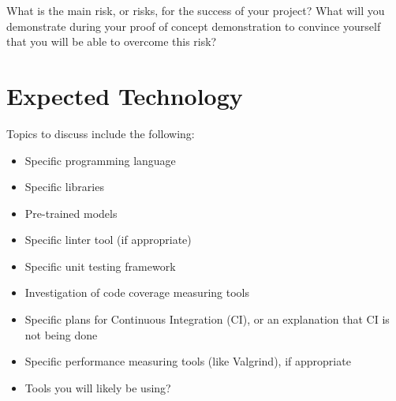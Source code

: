 \documentclass{article}
\begin{document}
What is the main risk, or risks, for the success of your project?  What will you
demonstrate during your proof of concept demonstration to convince yourself that
you will be able to overcome this risk?

\section{Expected Technology}



Topics to discuss include the following:

\begin{itemize}
\item Specific programming language
\item Specific libraries
\item Pre-trained models
\item Specific linter tool (if appropriate)
\item Specific unit testing framework
\item Investigation of code coverage measuring tools
\item Specific plans for Continuous Integration (CI), or an explanation that CI
  is not being done
\item Specific performance measuring tools (like Valgrind), if
  appropriate
\item Tools you will likely be using?
\end{itemize}

\end{document}
